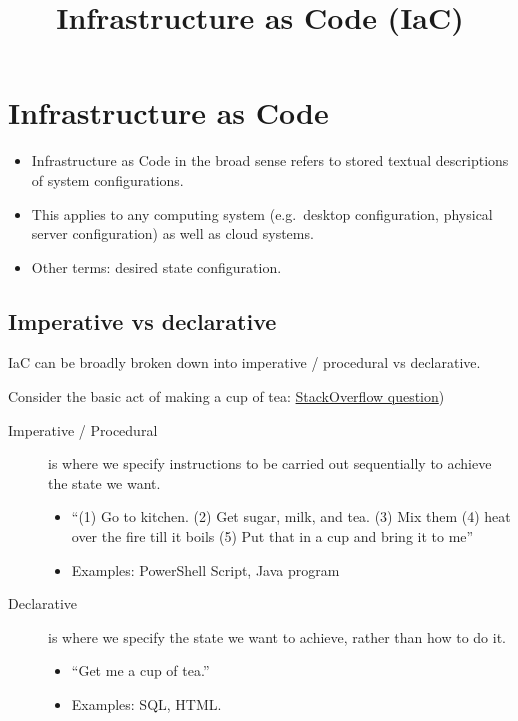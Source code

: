 \documentclass[slides]{pgnotes}
\title{Infrastructure as Code (IaC)}
\begin{document}
\maketitle

\section{Infrastructure as Code}\label{infrastructure-as-code}

\begin{itemize}
\item
  Infrastructure as Code in the broad sense refers to stored textual descriptions of system configurations.
\item
  This applies to any computing system (e.g.~desktop configuration, physical server configuration) as well as cloud systems.
\item
  Other terms: desired state configuration.
\end{itemize}
  
\subsection{Imperative vs declarative}\label{imperative-vs-declarative}

IaC can be broadly broken down into imperative / procedural vs declarative.

Consider the basic act of making a cup of tea:
\href{https://stackoverflow.com/questions/1619834/what-is-the-difference-between-declarative-and-procedural-programming-paradigms}{StackOverflow
question})

\begin{description}
\item[Imperative / Procedural]
is where we specify instructions to be carried out sequentially to
achieve the state we want.

\begin{itemize}
\item
  ``(1) Go to kitchen. (2) Get sugar, milk, and tea. (3) Mix them (4)
  heat over the fire till it boils (5) Put that in a cup and bring it to
  me''
\item
  Examples: PowerShell Script, Java program
\end{itemize}
\item[Declarative]
is where we specify the state we want to achieve, rather than how to do
it.

\begin{itemize}
\item
  ``Get me a cup of tea.''
\item
  Examples: SQL, HTML.
\end{itemize}
\end{description}
\end{document}
